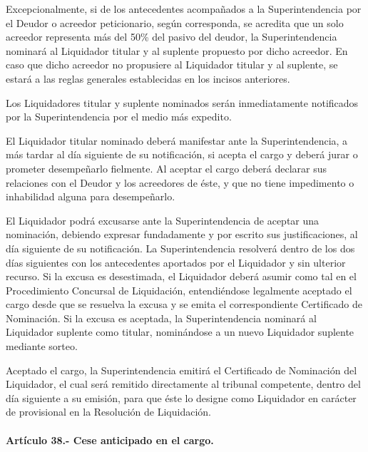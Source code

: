 \documentclass[
]{book}
\begin{document}
Excepcionalmente, si de los antecedentes acompañados a la Superintendencia por el Deudor o acreedor peticionario, según corresponda, se acredita que un solo acreedor representa más del 50\% del pasivo del deudor, la Superintendencia nominará al Liquidador titular y al suplente propuesto por dicho acreedor. En caso que dicho acreedor no propusiere al Liquidador titular y al suplente, se estará a las reglas generales establecidas en los incisos anteriores.

Los Liquidadores titular y suplente nominados serán inmediatamente notificados por la Superintendencia por el medio más expedito.

El Liquidador titular nominado deberá manifestar ante la Superintendencia, a más tardar al día siguiente de su notificación, si acepta el cargo y deberá jurar o prometer desempeñarlo fielmente. Al aceptar el cargo deberá declarar sus relaciones con el Deudor y los acreedores de éste, y que no tiene impedimento o inhabilidad alguna para desempeñarlo.

El Liquidador podrá excusarse ante la Superintendencia de aceptar una nominación, debiendo expresar fundadamente y por escrito sus justificaciones, al día siguiente de su notificación. La Superintendencia resolverá dentro de los dos días siguientes con los antecedentes aportados por el Liquidador y sin ulterior recurso. Si la excusa es desestimada, el Liquidador deberá asumir como tal en el Procedimiento Concursal de Liquidación, entendiéndose legalmente aceptado el cargo desde que se resuelva la excusa y se emita el correspondiente Certificado de Nominación. Si la excusa es aceptada, la Superintendencia nominará al Liquidador suplente como titular, nominándose a un nuevo Liquidador suplente mediante sorteo.

Aceptado el cargo, la Superintendencia emitirá el Certificado de Nominación del Liquidador, el cual será remitido directamente al tribunal competente, dentro del día siguiente a su emisión, para que éste lo designe como Liquidador en carácter de provisional en la Resolución de Liquidación.

\hypertarget{artuxedculo-38.--cese-anticipado-en-el-cargo.}{%
\paragraph*{Artículo 38.- Cese anticipado en el cargo.}\label{artuxedculo-38.--cese-anticipado-en-el-cargo.}}
\end{document}

